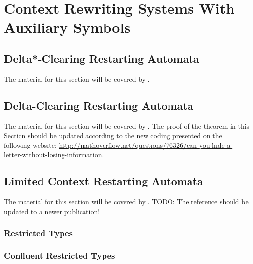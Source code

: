 \chapter{Context Rewriting Systems With Auxiliary Symbols}

\section{Delta*-Clearing Restarting Automata}

The material for this section will be covered by \cite{CM11}.

\section{Delta-Clearing Restarting Automata}

The material for this section will be covered by \cite{CM11}.
The proof of the theorem in this Section should be updated according to the new coding presented on the following website: 
\url{http://mathoverflow.net/questions/76326/can-you-hide-a-letter-without-losing-information}.

\section{Limited Context Restarting Automata}

The material for this section will be covered by \cite{OCM12}.
TODO: The reference should be updated to a newer publication!

\subsection{Restricted Types}

\subsection{Confluent Restricted Types}
